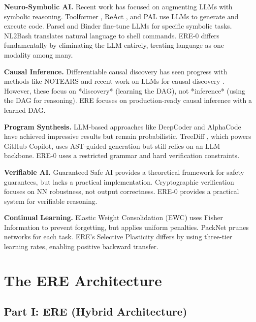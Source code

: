 \documentclass{article}
\begin{document}
\textbf{Neuro-Symbolic AI.} Recent work has focused on augmenting LLMs with symbolic reasoning. Toolformer , ReAct , and PAL  use LLMs to generate and execute code. Parsel  and Binder  fine-tune LLMs for specific symbolic tasks. NL2Bash  translates natural language to shell commands. ERE-0 differs fundamentally by eliminating the LLM entirely, treating language as one modality among many.

\textbf{Causal Inference.} Differentiable causal discovery has seen progress with methods like NOTEARS  and recent work on LLMs for causal discovery . However, these focus on *discovery* (learning the DAG), not *inference* (using the DAG for reasoning). ERE focuses on production-ready causal inference with a learned DAG.

\textbf{Program Synthesis.} LLM-based approaches like DeepCoder  and AlphaCode  have achieved impressive results but remain probabilistic. TreeDiff , which powers GitHub Copilot, uses AST-guided generation but still relies on an LLM backbone. ERE-0 uses a restricted grammar and hard verification constraints.

\textbf{Verifiable AI.} Guaranteed Safe AI  provides a theoretical framework for safety guarantees, but lacks a practical implementation. Cryptographic verification  focuses on NN robustness, not output correctness. ERE-0 provides a practical system for verifiable reasoning.

\textbf{Continual Learning.} Elastic Weight Consolidation (EWC)  uses Fisher Information to prevent forgetting, but applies uniform penalties. PackNet  prunes networks for each task. ERE's Selective Plasticity differs by using three-tier learning rates, enabling positive backward transfer.

\section{The ERE Architecture}

\subsection{Part I: ERE (Hybrid Architecture)}
\end{document}
